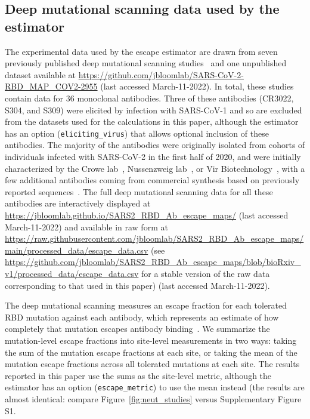 \documentclass[9pt,twocolumn,twoside]{gsajnl_modified}
\begin{document}
{\subsection{Deep mutational scanning data used by the estimator}
The experimental data used by the escape estimator are drawn from seven previously published deep mutational scanning studies~\citep{greaney2021complete,greaney2021mapping,starr2021prospective,starr2021complete,starr2021sars,dong2021genetic,tortorici2021broad} and one unpublished dataset available at \url{https://github.com/jbloomlab/SARS-CoV-2-RBD_MAP_COV2-2955} (last accessed March-11-2022).
In total, these studies contain data for 36 monoclonal antibodies.
Three of these antibodies (CR3022, S304, and S309) were elicited by infection with SARS-CoV-1 and so are excluded from the datasets used for the calculations in this paper, although the estimator has an option (\texttt{eliciting\_virus}) that allows optional inclusion of these antibodies.
The majority of the antibodies were originally isolated from cohorts of individuals infected with SARS-CoV-2 in the first half of 2020, and were initially characterized by the Crowe lab~\citep{zost2020potently}, Nussenzweig lab~\citep{robbiani2020convergent}, or Vir Biotechnology~\citep{piccoli2020mapping}, with a few additional antibodies coming from commercial synthesis based on previously reported sequences~\citep{hansen2020studies,jones2021neutralizing,shi2020human}.
The full deep mutational scanning data for all these antibodies are interactively displayed at \url{https://jbloomlab.github.io/SARS2_RBD_Ab_escape_maps/} (last accessed March-11-2022) and available in raw form at \url{https://raw.githubusercontent.com/jbloomlab/SARS2_RBD_Ab_escape_maps/main/processed_data/escape_data.csv} (see \url{https://github.com/jbloomlab/SARS2_RBD_Ab_escape_maps/blob/bioRxiv_v1/processed_data/escape_data.csv} for a stable version of the raw data corresponding to that used in this paper) (last accessed March-11-2022).

The deep mutational scanning measures an escape fraction for each tolerated RBD mutation against each antibody, which represents an estimate of how completely that mutation escapes antibody binding~\citep{greaney2021complete}.
We summarize the mutation-level escape fractions into site-level measurements in two ways: taking the sum of the mutation escape fractions at each site, or taking the mean of the mutation escape fractions across all tolerated mutations at each site.
The results reported in this paper use the sums as the site-level metric, although the estimator has an option (\texttt{escape\_metric}) to use the mean instead (the results are almost identical: compare Figure~\ref{fig:neut_studies} versus Supplementary Figure S1.

}
\end{document}
